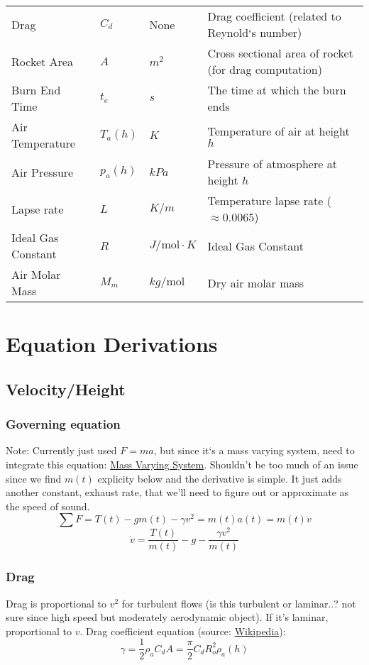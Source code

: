 \documentclass[12pt,a4paper]{article}
\begin{document}
\begin{tabular}{l | l | l | l}
    Drag               & $C_d$       & None                  & Drag coefficient (related to Reynold‘s number) \\
    Rocket Area        & $A$         & $m^2$                 & Cross sectional area of rocket (for drag computation) \\
    Burn End Time      & $t_e$       & $s$                   & The time at which the burn ends \\
    Air Temperature    & $T_a(h)$    & $K$                   & Temperature of air at height $h$ \\
    Air Pressure       & $p_a(h)$    & $kPa$                 & Pressure of atmosphere at height $h$ \\
    Lapse rate         & $L$         & $K/m$                 & Temperature lapse rate ($\approx 0.0065$) \\
    Ideal Gas Constant & $R$         & $J/\text{mol}\cdot K$ & Ideal Gas Constant \\
    Air Molar Mass     & $M_m$       & $kg/\text{mol}$        & Dry air molar mass
\end{tabular}

\section{Equation Derivations}
\subsection{Velocity/Height}
\subsubsection{Governing equation}
Note: Currently just used $F=ma$, but since it‘s a mass varying system, need to integrate this equation: \hyperlink{’https://en.wikipedia.org/wiki/Variable-mass_system}{Mass Varying System}. Shouldn’t be too much of an issue since we find $m(t)$ explicity below and the derivative is simple. It just adds another constant, exhaust rate, that we’ll need to figure out or approximate as the speed of sound.
$$\sum F = T(t) - gm(t) - \gamma v^2 = m(t)a(t) = m(t)\dot{v}$$
\begin{equation}
\dot{v} = \frac{T(t)}{m(t)} - g - \frac{\gamma v^2}{m(t)}
\label{eq:main}
\end{equation}

\subsubsection{Drag}
Drag is proportional to $v^2$ for turbulent flows (is this turbulent or laminar..? not sure since high speed but moderately aerodynamic object). If it’s laminar, proportional to $v$.
Drag coefficient equation (source: \href{https://en.wikipedia.org/wiki/Drag_(physics)#Types_of_drag}{Wikipedia}):
\begin{equation}
\gamma = \frac{1}{2}\rho_a C_d A = \frac{\pi}{2} C_d R_o^2\rho_a(h)
\label{eq:gamma}
\end{equation}
\end{document}
